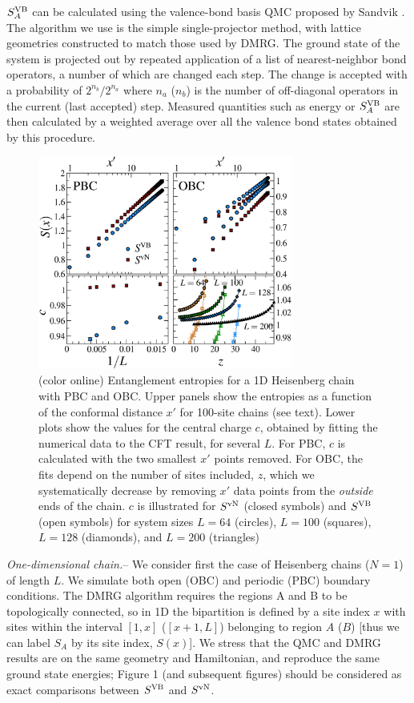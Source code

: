 \documentclass[prl,aps,twocolumn,floatfix,amsmath,amssymb,superscriptaddress,tightenlines]{revtex4}
\begin{document}
$S^{\rm VB}_A$ 
can be calculated using the valence-bond basis
QMC proposed by Sandvik \cite{Sandvik}.  The 
algorithm we use is the simple single-projector method, with lattice
geometries constructed to match those used by DMRG.
The
ground state of the system is projected out by repeated application of a
list of nearest-neighbor bond operators,
a number
of which are changed each step.  The change is accepted
with a probability of $2^{n_{b}}/2^{n_{a}} $ where $n_{a}$ ($n_{b}$)
is the number of off-diagonal operators in the current (last accepted) step.
Measured quantities such as energy or $S^{\rm VB}_A$ are then calculated 
by a weighted average over all the valence bond
states obtained by this procedure.

\begin{figure} {
\includegraphics[width=3.3in]{4-panelFIG1.eps} \caption{(color online) 
Entanglement entropies for a 1D Heisenberg chain with PBC and OBC. Upper
panels show the entropies as a function of the conformal distance $x'$ for
100-site chains (see text).  Lower plots show the values for the central
charge $c$, obtained by fitting the numerical data to the CFT result, for
several $L$.  For PBC, $c$ is calculated with the two smallest $x'$ points
removed.  For OBC, the fits depend on the number of sites included, $z$,
which we systematically decrease by removing $x'$ data points from the
{\it outside} ends of the chain.  $c$ is illustrated for $S^{\rm vN}$
(closed symbols) and $S^{\rm VB}$ (open symbols) for system sizes $L=64$
(circles), $L=100$ (squares), $L=128$ (diamonds), and $L=200$ (triangles)
\label{1D}}} \end{figure}

{\it One-dimensional chain.}-- We consider first the case of Heisenberg
chains ($N=1$) of length $L$. We simulate both open (OBC) and periodic
(PBC) boundary conditions.  The DMRG algorithm requires the regions A and
B to be topologically connected, so in 1D the bipartition is defined by a
site index $x$ with sites within the interval $[1,x]$ ($[x+1,L]$)
belonging to region $A$ ($B$) [thus we can label $S_A$ by its site index,
$S(x)$].  We stress that the QMC and DMRG results are on the same geometry
and Hamiltonian, and reproduce the same ground state energies; Figure 1
(and subsequent figures) should 
be considered as exact comparisons between
$S^{\rm VB}$ and $S^{ \rm vN}$.
\end{document}
